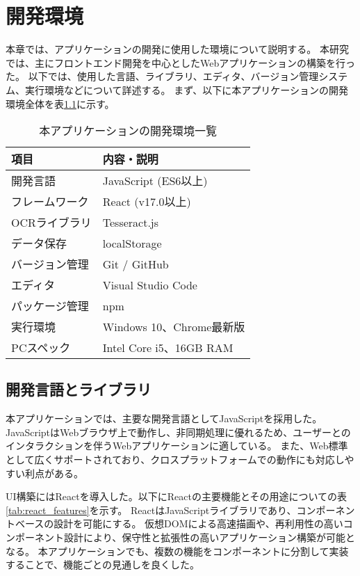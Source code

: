 \documentclass[main]{subfiles}
\begin{document}
\chapter{開発環境}
\label{cha:environment}
本章では、アプリケーションの開発に使用した環境について説明する。
本研究では、主にフロントエンド開発を中心としたWebアプリケーションの構築を行った。
以下では、使用した言語、ライブラリ、エディタ、バージョン管理システム、実行環境などについて詳述する。
まず、以下に本アプリケーションの開発環境全体を表\ref{tab:dev_environment}に示す。

\begin{table}[htbp]
\centering
\caption{本アプリケーションの開発環境一覧}
\label{tab:dev_environment}
\begin{tabular}{ll}
\hline
項目 & 内容・説明 \\
\hline
開発言語 & JavaScript (ES6以上) \\
フレームワーク & React (v17.0以上) \\
OCRライブラリ & Tesseract.js \\
データ保存 & localStorage \\
バージョン管理 & Git / GitHub \\
エディタ & Visual Studio Code \\
パッケージ管理 & npm \\
実行環境 & Windows 10、Chrome最新版 \\
PCスペック & Intel Core i5、16GB RAM \\
\hline
\end{tabular}
\end{table}

\section{開発言語とライブラリ}

本アプリケーションでは、主要な開発言語としてJavaScriptを採用した。  
JavaScriptはWebブラウザ上で動作し、非同期処理に優れるため、ユーザーとのインタラクションを伴うWebアプリケーションに適している。  
また、Web標準として広くサポートされており、クロスプラットフォームでの動作にも対応しやすい利点がある。

UI構築にはReactを導入した。以下にReactの主要機能とその用途についての表\ref{tab:react_features}を示す。
ReactはJavaScriptライブラリであり、コンポーネントベースの設計を可能にする。  
仮想DOMによる高速描画や、再利用性の高いコンポーネント設計により、保守性と拡張性の高いアプリケーション構築が可能となる。  
本アプリケーションでも、複数の機能をコンポーネントに分割して実装することで、機能ごとの見通しを良くした。
\end{document}
